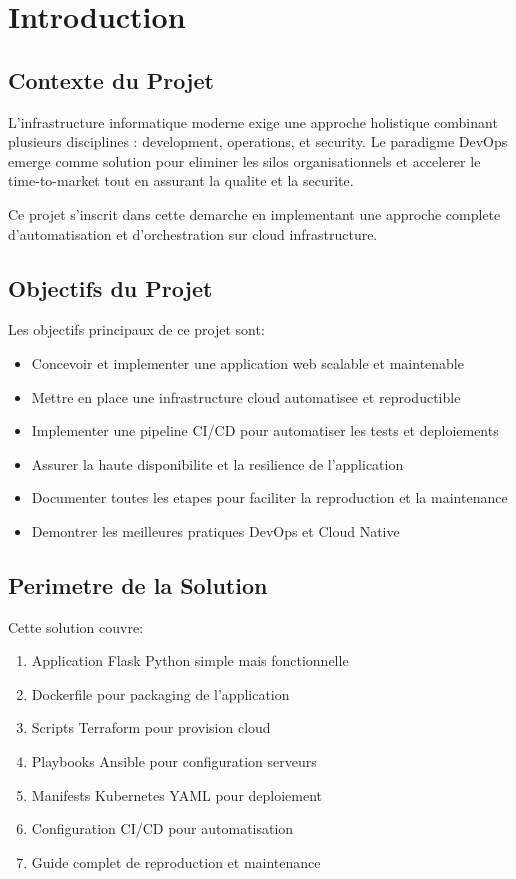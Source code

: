 \documentclass[12pt,a4paper]{report}
\begin{document}
\newpage

\chapter{Introduction}

\section{Contexte du Projet}

L'infrastructure informatique moderne exige une approche holistique combinant plusieurs disciplines : development, operations, et security. Le paradigme DevOps emerge comme solution pour eliminer les silos organisationnels et accelerer le time-to-market tout en assurant la qualite et la securite.

Ce projet s'inscrit dans cette demarche en implementant une approche complete d'automatisation et d'orchestration sur cloud infrastructure.

\section{Objectifs du Projet}

Les objectifs principaux de ce projet sont:

\begin{itemize}
    \item Concevoir et implementer une application web scalable et maintenable
    \item Mettre en place une infrastructure cloud automatisee et reproductible
    \item Implementer une pipeline CI/CD pour automatiser les tests et deploiements
    \item Assurer la haute disponibilite et la resilience de l'application
    \item Documenter toutes les etapes pour faciliter la reproduction et la maintenance
    \item Demontrer les meilleures pratiques DevOps et Cloud Native
\end{itemize}

\section{Perimetre de la Solution}

Cette solution couvre:

\begin{enumerate}
    \item Application Flask Python simple mais fonctionnelle
    \item Dockerfile pour packaging de l'application
    \item Scripts Terraform pour provision cloud
    \item Playbooks Ansible pour configuration serveurs
    \item Manifests Kubernetes YAML pour deploiement
    \item Configuration CI/CD pour automatisation
    \item Guide complet de reproduction et maintenance
\end{enumerate}
\end{document}
